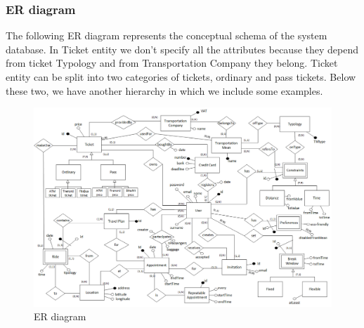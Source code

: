 	\subsubsection{ER diagram}
	The following ER diagram represents the conceptual schema of the system database. In Ticket entity we don't specify all the attributes because they depend from ticket Typology and from Transportation Company they belong. Ticket entity can be split into two categories of tickets, ordinary and pass tickets. Below these two, we have another hierarchy in which we include some examples.
	
    \begin{figure}[H]	
		\centerline{\includegraphics[width=0.9\paperwidth]{Images/ERdiagram}}
		\caption{ER diagram}
 	\end{figure}

	\filbreak
